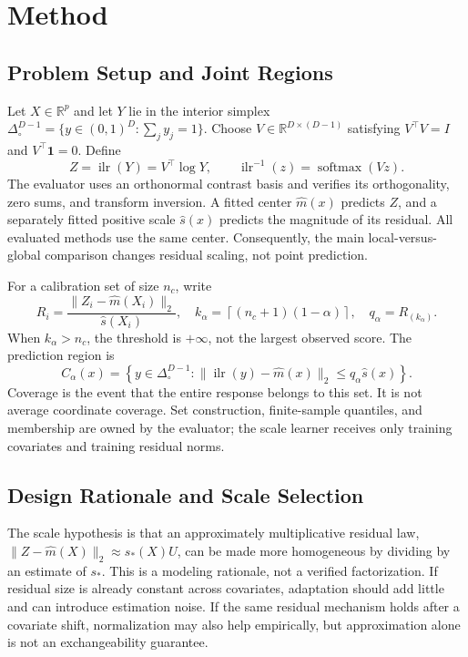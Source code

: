 \documentclass{article}
\newcommand{\ilr}{\operatorname{ilr}}
\newcommand{\softmax}{\operatorname{softmax}}
\newcommand{\R}{\mathbb{R}}
\begin{document}
\section{Method}
\subsection{Problem Setup and Joint Regions}
Let $X\in\R^p$ and let $Y$ lie in the interior simplex
$\Delta^{D-1}_{\circ}=\{y\in(0,1)^D:\sum_j y_j=1\}$.
Choose $V\in\R^{D\times(D-1)}$ satisfying $V^\top V=I$ and $V^\top\mathbf{1}=0$. Define
\begin{equation}
 Z=\ilr(Y)=V^\top\log Y,\qquad
 \ilr^{-1}(z)=\softmax(Vz).
\end{equation}
The evaluator uses an orthonormal contrast basis and verifies its orthogonality, zero sums, and transform inversion. A fitted center $\widehat m(x)$ predicts $Z$, and a separately fitted positive scale $\widehat s(x)$ predicts the magnitude of its residual. All evaluated methods use the same center. Consequently, the main local-versus-global comparison changes residual scaling, not point prediction.

For a calibration set of size $n_c$, write
\begin{equation}
 R_i=\frac{\|Z_i-\widehat m(X_i)\|_2}{\widehat s(X_i)},\quad
 k_\alpha=\left\lceil(n_c+1)(1-\alpha)\right\rceil,\quad
 q_\alpha=R_{(k_\alpha)}.
 \label{eq:calibration}
\end{equation}
When $k_\alpha>n_c$, the threshold is $+\infty$, not the largest observed score. The prediction region is
\begin{equation}
 C_\alpha(x)=\left\{y\in\Delta^{D-1}_{\circ}:\|\ilr(y)-\widehat m(x)\|_2
              \le q_\alpha\widehat s(x)\right\}.
 \label{eq:region}
\end{equation}
Coverage is the event that the entire response belongs to this set. It is not average coordinate coverage. Set construction, finite-sample quantiles, and membership are owned by the evaluator; the scale learner receives only training covariates and training residual norms.

\subsection{Design Rationale and Scale Selection}
The scale hypothesis is that an approximately multiplicative residual law,
$\|Z-\widehat m(X)\|_2\approx s_*(X)U$, can be made more homogeneous by dividing by an estimate of $s_*$. This is a modeling rationale, not a verified factorization. If residual size is already constant across covariates, adaptation should add little and can introduce estimation noise. If the same residual mechanism holds after a covariate shift, normalization may also help empirically, but approximation alone is not an exchangeability guarantee.
\end{document}

